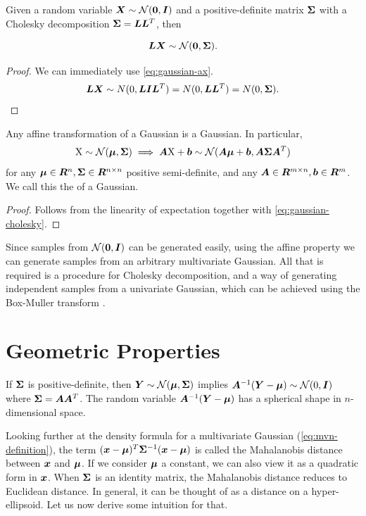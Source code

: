 \begin{thm}
  Given a random variable ${\bm{X}} \sim {\mathcal{N}}({\bm{0}}, {\bm{I}})$ and a positive-definite matrix
  ${\bm{\Sigma}}$ with a Cholesky decomposition ${\bm{\Sigma}} = {\bm{L}} {\bm{L}}^T$, then

  \begin{equation}
    {\bm{L}} {\bm{X}} \sim {\mathcal{N}}({\bm{0}}, {\bm{\Sigma}}).
    \label{eq:gaussian-cholesky}
  \end{equation}
\end{thm}

\begin{proof}
  We can immediately use \autoref{eq:gaussian-ax}.
  \begin{align}
    {\bm{L}} {\bm{X}} \sim N(0, {\bm{L}} {\bm{I}} {\bm{L}}^T) = N(0, {\bm{L}} {\bm{L}}^T) = N(0, {\bm{\Sigma}}).
  \end{align}
\end{proof}

\begin{thm}
  Any affine transformation of a Gaussian is a Gaussian. In particular,
  $$
    {\textnormal{X}} \sim {\mathcal{N}}({\boldsymbol{\mu}}, {\bm{\Sigma}}) \implies {\bm{A}} {\textnormal{X}} + {\boldsymbol{b}} \sim {\mathcal{N}}({\bm{A}} {\boldsymbol{\mu}} + {\boldsymbol{b}}, {\bm{A}} {\bm{\Sigma}} {\bm{A}}^T)
  $$
  for any ${\boldsymbol{\mu}} \in {\bm{R}}^n, {\bm{\Sigma}} \in {\bm{R}}^{n \times n}$ positive
  semi-definite, and any ${\bm{A}} \in {\bm{R}}^{m \times n}, {\boldsymbol{b}} \in {\bm{R}}^m$.
  We call this the  of a Gaussian.
\end{thm}

\begin{proof}
  Follows from the linearity of expectation together with \autoref{eq:gaussian-cholesky}.
\end{proof}

Since samples from ${\mathcal{N}}({\bm{0}}, {\bm{I}})$ can be generated easily, using the
affine property we can generate samples from an arbitrary multivariate
Gaussian. All that is required is a procedure for Cholesky decomposition, and a
way of generating independent samples from a univariate Gaussian, which can be
achieved using the Box-Muller transform \citep{box-muller1958note}.


\section{Geometric Properties}

If ${\bm{\Sigma}}$ is positive-definite, then ${\bm{Y}} \sim {\mathcal{N}}({\boldsymbol{\mu}}, {\bm{\Sigma}})$ implies
${\bm{A}}^{-1} ({\bm{Y}} - {\boldsymbol{\mu}}) \sim \mathcal{N}(0, {\bm{I}})$ where ${\bm{\Sigma}} = {\bm{A}} {\bm{A}}^T$.  The random
variable ${\bm{A}}^{-1} ({\bm{Y}} - {\boldsymbol{\mu}})$ has a spherical shape in $n$-dimensional
space.

Looking further at the density formula for a multivariate Gaussian
(\autoref{eq:mvn-definition}), the term $({\boldsymbol{x}} - {\boldsymbol{\mu}})^T {\bm{\Sigma}}^{-1}({\boldsymbol{x}} -
{\boldsymbol{\mu}})$ is called the Mahalanobis distance between ${\boldsymbol{x}}$ and ${\boldsymbol{\mu}}$. If we
consider ${\boldsymbol{\mu}}$ a constant, we can also view it as a quadratic form in ${\boldsymbol{x}}$.
When ${\bm{\Sigma}}$ is an identity matrix, the Mahalanobis distance reduces to
Euclidean distance. In general, it can be thought of as a distance on a
hyper-ellipsoid. Let us now derive some intuition for that.

